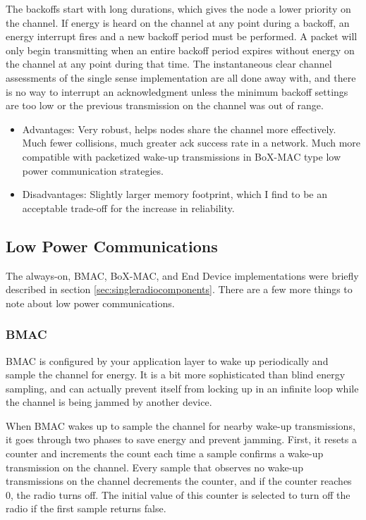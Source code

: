 \documentclass{article}
\begin{document}
The backoffs start with long durations, which gives the node a lower
priority on the channel. If energy is heard on the channel at any point
during a backoff, an energy interrupt fires and a new backoff period 
must be performed. A packet will only begin transmitting when an 
entire backoff period expires without energy on the channel at any point
during that time. The instantaneous clear channel assessments of the
single sense implementation are all done away with, and there is no way
to interrupt an acknowledgment unless the minimum backoff settings are too low or the previous transmission on the channel was out of range.

\begin{itemize}
  \item Advantages: Very robust, helps nodes share the channel
  more effectively. Much fewer collisions, much greater ack success
  rate in a network. Much more compatible with packetized wake-up
  transmissions in BoX-MAC type low power communication strategies.
  \item Disadvantages: Slightly larger memory footprint, which I find
  to be an acceptable trade-off for the increase in reliability.
\end{itemize}

\subsection{Low Power Communications}
\label{sec:lpl}
The always-on, BMAC, BoX-MAC, and End Device implementations were briefly 
described in section \ref{sec:singleradiocomponents}.  There are a few more things
to note about low power communications.  

\subsubsection{BMAC}
\label{sec:bmac}
BMAC \cite{bmac} is configured by
your application layer to wake up periodically and sample the channel
for energy.  It is a bit more sophisticated than blind energy sampling, 
and can actually prevent itself from locking up in an infinite loop
while the channel is being jammed by another device.

When BMAC wakes up to sample the channel for nearby wake-up transmissions,
it goes through two phases to save energy and prevent jamming. First,
it resets a counter and increments the count each time a sample confirms a
wake-up transmission on the channel. Every sample that observes no wake-up 
transmissions on the channel decrements the counter, and if the counter reaches
0, the radio turns off.  The initial value of this counter is selected to 
turn off the radio if the first sample returns false.
\end{document}
